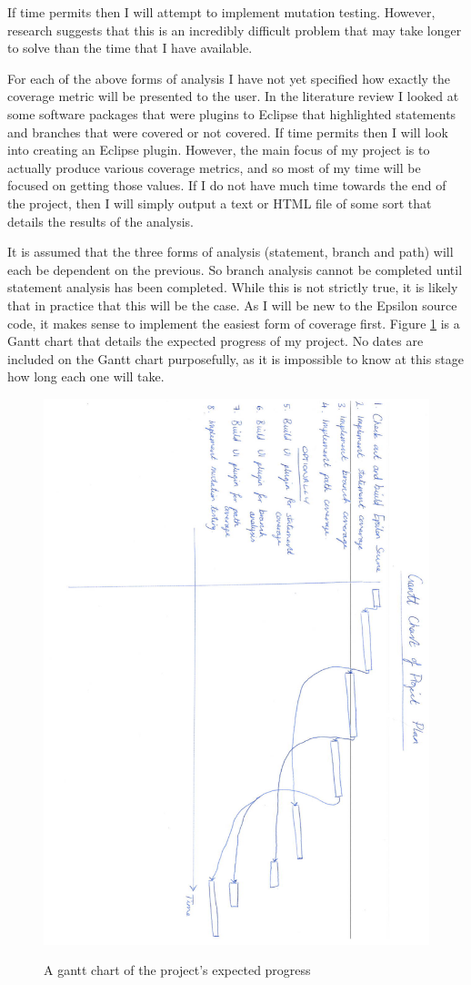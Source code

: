 If time permits then I will attempt to implement mutation testing. However, research suggests that this is an incredibly difficult problem that may take longer to solve than the time that I have available.

For each of the above forms of analysis I have not yet specified how exactly the coverage metric will be presented to the user. In the literature review I looked at some software packages that were plugins to Eclipse that highlighted statements and branches that were covered or not covered. If time permits then I will look into creating an Eclipse plugin. However, the main focus of my project is to actually produce various coverage metrics, and so most of my time will be focused on getting those values. If I do not have much time towards the end of the project, then I will simply output a text or HTML file of some sort that details the results of the analysis.

It is assumed that the three forms of analysis (statement, branch and path) will each be dependent on the previous. So branch analysis cannot be completed until statement analysis has been completed. While this is not strictly true, it is likely that in practice that this will be the case. As I will be new to the Epsilon source code, it makes sense to implement the easiest form of coverage first. Figure \ref{ganttChart} is a Gantt chart that details the expected progress of my project. No dates are included on the Gantt chart purposefully, as it is impossible to know at this stage how long each one will take.

\begin{figure}
\includegraphics[scale=0.5]{figures/gantt.pdf}
\label{ganttChart}
\caption{A gantt chart of the project's expected progress}
\end{figure}